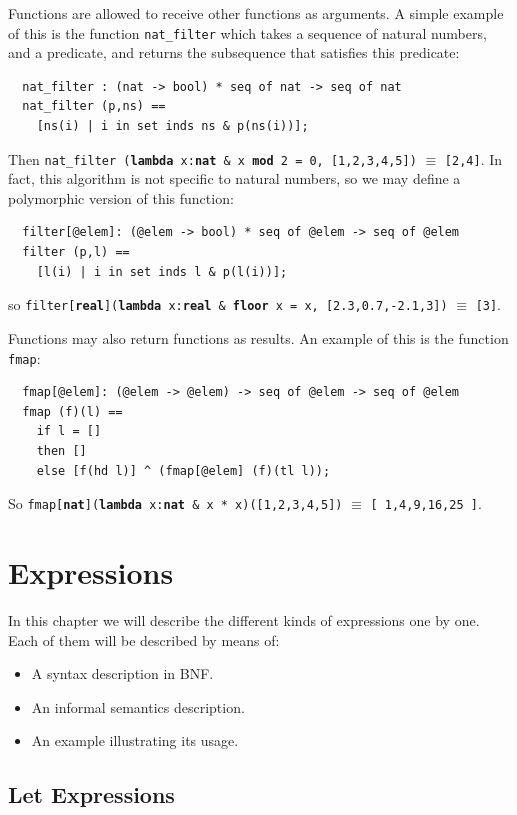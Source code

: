 \documentclass{overturerepchap}
\newcommand{\keyw}[1]{{\bf\ttfamily #1}}
\begin{document}
Functions are allowed to receive other functions as arguments. A
simple example of this is the function \texttt{nat\_filter} which
takes a sequence of natural numbers, and a predicate, and returns the
subsequence that satisfies this predicate:
\begin{lstlisting}
  nat_filter : (nat -> bool) * seq of nat -> seq of nat
  nat_filter (p,ns) ==
    [ns(i) | i in set inds ns & p(ns(i))];
\end{lstlisting}
Then 
  \texttt{nat\_filter (\keyw{lambda} x:\keyw{nat} \& x \keyw{mod} 2 = 0, [1,2,3,4,5])} $\equiv$ \texttt{[2,4]}.
In fact, this algorithm is not specific to natural numbers, so we may
define a polymorphic version of this function:
\begin{lstlisting}
  filter[@elem]: (@elem -> bool) * seq of @elem -> seq of @elem
  filter (p,l) ==
    [l(i) | i in set inds l & p(l(i))];
\end{lstlisting}
\label{filterdef}
so \texttt{filter[\keyw{real}](\keyw{lambda} x:\keyw{real} \&
  \keyw{floor} x = x, [2.3,0.7,-2.1,3])} $\equiv$  \texttt{[3]}.


Functions may also return functions as results. An example of this is
the function \texttt{fmap}:
\begin{lstlisting}
  fmap[@elem]: (@elem -> @elem) -> seq of @elem -> seq of @elem
  fmap (f)(l) ==
    if l = []
    then []
    else [f(hd l)] ^ (fmap[@elem] (f)(tl l));
\end{lstlisting}
So \texttt{fmap[\keyw{nat}](\keyw{lambda} x:\keyw{nat} \& x * x)([1,2,3,4,5])} $\equiv$ 
\texttt{[ 1,4,9,16,25 ]}.

\chapter{Expressions}\label{chap:expr}

In this chapter we will describe the different kinds of expressions
one by one. Each of them will be described by means of:
\begin{itemize}
\item A syntax description in BNF.
\item An informal semantics description.
\item An example illustrating its usage.
\end{itemize}

\section{Let Expressions}\label{let-exp}
\end{document}
